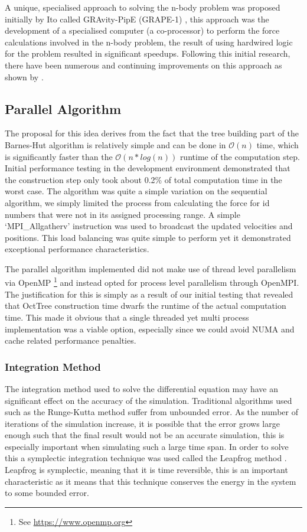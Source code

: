 \documentclass[acmtog,screen, nonacm=true]{acmart}
\begin{document}
A unique, specialised approach to solving the n-body problem was proposed initially by Ito called GRAvity-PipE (GRAPE-1) \cite{ito1990special}, this approach was the development of a specialised computer (a co-processor) to perform the force calculations involved in the n-body problem, the result of using hardwired logic for the problem resulted in significant speedups. Following this initial research, there have been numerous and continuing improvements on this approach as shown by \cite{kawai2000grape, makino1997grape, makino2012grape}. 

\subsection{Parallel Algorithm}
The proposal for this idea derives from the fact that the tree building part of the Barnes-Hut algorithm is relatively simple and can be done in $\mathcal{O}(n)$ time, which is significantly faster than the $\mathcal{O}(n*log(n))$ runtime of the computation step. Initial performance testing in the development environment demonstrated that the construction step only took about 0.2\% of total computation time in the worst case. The algorithm was quite a simple variation on the sequential algorithm, we simply limited the process from calculating the force for id numbers that were not in its assigned processing range. A simple `MPI\_Allgatherv' instruction was used to broadcast the updated velocities and positions. This load balancing was quite simple to perform yet it demonstrated exceptional performance characteristics.

The parallel algorithm implemented did not make use of thread level parallelism via OpenMP \footnote{See \url{https://www.openmp.org}} and instead opted for process level parallelism through OpenMPI. The justification for this is simply as a result of our initial testing that revealed that OctTree construction time dwarfs the runtime of the actual computation time. This made it obvious that a single threaded yet multi process implementation was a viable option, especially since we could avoid NUMA and cache related performance penalties.  


\subsubsection{Integration Method}
The integration method used to solve the differential equation may have an significant effect on the accuracy of the simulation. Traditional algorithms used such as the Runge-Kutta method suffer from unbounded error. As the number of iterations of the simulation increase, it is possible that the error grows large enough such that the final result would not be an accurate simulation, this is especially important when simulating such a large time span. In order to solve this a symplectic integration technique was used called the Leapfrog method \cite{iserles1986generalized}. Leapfrog is symplectic, meaning that it is time reversible, this is an important characteristic as it means that this technique conserves the energy in the system to some bounded error. 
\end{document}
